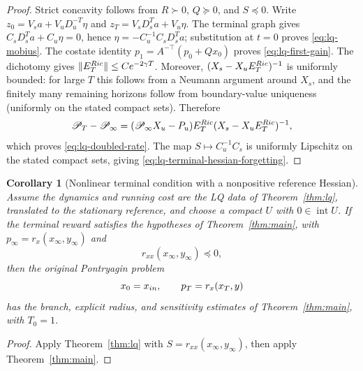 \documentclass[twocolumn,nameyear,amsthm]{autart}
\newcommand{\xinf}{x_\infty}
\newcommand{\pinf}{p_\infty}
\numberwithin{equation}{section}
\newtheorem{corollary}[theorem]{Corollary}
\begin{document}
\begin{proof}
Strict concavity follows from $R\succ0$, $Q\succeq0$, and $S\preceq0$.
Write $z_0=V_sa+V_uD_u^{-T}\eta$ and
$z_T=V_sD_s^Ta+V_u\eta$.  The terminal graph gives
$C_sD_s^Ta+C_u\eta=0$, hence
$\eta=-C_u^{-1}C_sD_s^Ta$; substitution at $t=0$ proves
\eqref{eq:lq-mobius}.  The costate identity
$p_1=A^{-\top}(p_0+Qx_0)$ proves \eqref{eq:lq-first-gain}.
The dichotomy gives $\|E_T^{\rm Ric}\|\le Ce^{-2\gamma T}$.  Moreover,
$(X_s-X_uE_T^{\rm Ric})^{-1}$ is uniformly bounded: for large $T$ this
follows from a Neumann argument around $X_s$, and the finitely many remaining
horizons follow from boundary-value uniqueness (uniformly on the stated
compact sets).  Therefore
\[
 \mathscr P_T-\mathscr P_\infty
 =(\mathscr P_\infty X_u-P_u)E_T^{\rm Ric}
   (X_s-X_uE_T^{\rm Ric})^{-1},
\]
which proves \eqref{eq:lq-doubled-rate}.  The map
$S\mapsto C_u^{-1}C_s$ is uniformly Lipschitz on the stated compact sets,
giving \eqref{eq:lq-terminal-hessian-forgetting}.
\end{proof}

\begin{corollary}[Nonlinear terminal condition with a nonpositive reference Hessian]\label{cor:original-concave}
Assume the dynamics and running cost are the LQ data of
Theorem~\ref{thm:lq}, translated to the stationary reference, and choose a
compact $U$ with $0\in\operatorname{int}U$.  If the terminal reward satisfies
the hypotheses of Theorem~\ref{thm:main}, with
$\pinf=r_x(\xinf,y_\infty)$ and
\[
       r_{xx}(\xinf,y_\infty)\preceq0 ,
\]
then the original Pontryagin problem
\[
      x_0=x_{\rm in},\qquad p_T=r_x(x_T,y)
\]
has the branch, explicit radius, and sensitivity estimates of
Theorem~\ref{thm:main}, with $T_0=1$.
\end{corollary}
\begin{proof}
Apply Theorem~\ref{thm:lq} with
$S=r_{xx}(\xinf,y_\infty)$, then apply Theorem~\ref{thm:main}.
\end{proof}
\end{document}

